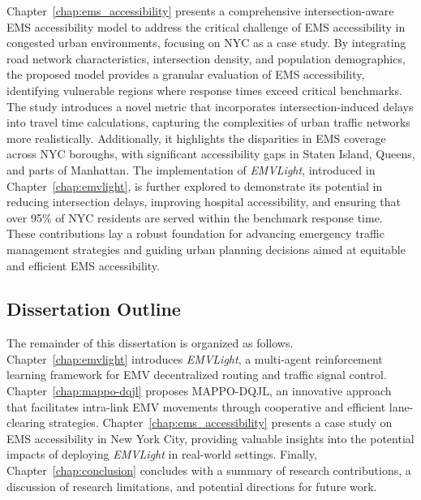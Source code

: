 Chapter~\ref{chap:ems_accessibility} presents a comprehensive intersection-aware EMS accessibility model to address the critical challenge of EMS accessibility in congested urban environments, focusing on NYC as a case study. By integrating road network characteristics, intersection density, and population demographics, the proposed model provides a granular evaluation of EMS accessibility, identifying vulnerable regions where response times exceed critical benchmarks. The study introduces a novel metric that incorporates intersection-induced delays into travel time calculations, capturing the complexities of urban traffic networks more realistically. Additionally, it highlights the disparities in EMS coverage across NYC boroughs, with significant accessibility gaps in Staten Island, Queens, and parts of Manhattan. The implementation of \textit{EMVLight}, introduced in Chapter~\ref{chap:emvlight}, is further explored to demonstrate its potential in reducing intersection delays, improving hospital accessibility, and ensuring that over 95\% of NYC residents are served within the benchmark response time. These contributions lay a robust foundation for advancing emergency traffic management strategies and guiding urban planning decisions aimed at equitable and efficient EMS accessibility.

\subsection{Dissertation Outline}

The remainder of this dissertation is organized as follows. Chapter~\ref{chap:emvlight} introduces \textit{EMVLight}, a multi-agent reinforcement learning framework for EMV decentralized routing and traffic signal control. Chapter~\ref{chap:mappo-dqjl} proposes MAPPO-DQJL, an innovative approach that facilitates intra-link EMV movements through cooperative and efficient lane-clearing strategies. Chapter~\ref{chap:ems_accessibility} presents a case study on EMS accessibility in New York City, providing valuable insights into the potential impacts of deploying \textit{EMVLight} in real-world settings. Finally, Chapter~\ref{chap:conclusion} concludes with a summary of research contributions, a discussion of research limitations, and potential directions for future work.

